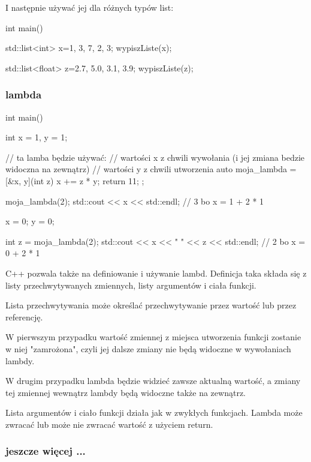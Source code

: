 I następnie używać jej dla różnych typów list:

\begin{CodeFrame*}[cpp]{}
int main() {
    std::list<int> x={1, 3, 7, 2, 3};
    wypiszListe(x);
    
    std::list<float> z={2.7, 5.0, 3.1, 3.9};
    wypiszListe(z);
}
\end{CodeFrame*}


\subsubsection{lambda}

\begin{CodeFrame*}[cpp]{}
int main() {
    int x = 1, y = 1;

    // ta lamba będzie używać:
    //  wartości x z chwili wywołania (i jej zmiana bedzie widoczna na zewnątrz)
    //  wartości y z chwili utworzenia
    auto moja_lambda = [&x, y](int z) { x += z * y; return 11; };

    moja_lambda(2);
    std::cout << x << std::endl; // 3 bo x = 1 + 2 * 1

    x = 0;
    y = 0;

    int z = moja_lambda(2);
    std::cout << x << " " << z << std::endl; // 2 bo x = 0 + 2 * 1
}
\end{CodeFrame*}

C++ pozwala także na definiowanie i używanie lambd. Definicja taka składa
się z listy przechwytywanych zmiennych, listy argumentów i ciała funkcji.

Lista przechwytywania może określać przechwytywanie przez wartość lub przez referencję.

W pierwszym przypadku wartość zmiennej z miejsca utworzenia funkcji zostanie w niej "zamrożona",
czyli jej dalsze zmiany nie będą widoczne w wywołaniach lambdy.

W drugim przypadku lambda będzie widzieć zawsze aktualną wartość,
a zmiany tej zmiennej wewnątrz lambdy będą widoczne także na zewnątrz.

Lista argumentów i ciało funkcji działa jak w zwykłych funkcjach.
Lambda może zwracać lub może nie zwracać wartość z użyciem return.

\subsubsection{jeszcze więcej ... }

